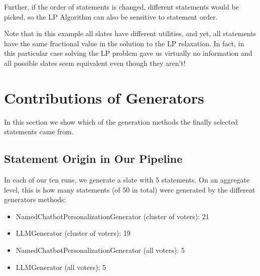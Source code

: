\documentclass[11pt]{article}
\begin{document}
Further, if the order of statements is changed, different statements would be picked, so the LP Algorithm can also be sensitive to statement order.

Note that in this example all slates have different utilities,
and yet, all statements have the same fractional value in the solution to the LP relaxation.
In fact, in this particular case solving the LP problem gave us virtually no information and all possible slates seem equivalent even though they aren't!


\section{Contributions of Generators} \label{app:statement-origin}

In this section we show which of the generation methods the finally selected statements came from.

\subsection{Statement Origin in Our Pipeline}
In each of our ten runs, we generate a slate with 5 statements. On an aggregate level, this is how many statements (of 50 in total) were generated by the different generators methods:
\begin{itemize}
    \item NamedChatbotPersonalizationGenerator (cluster of voters): 21
    \item LLMGenerator (cluster of voters): 19
    \item NamedChatbotPersonalizationGenerator (all voters): 5
    \item LLMGenerator (all voters): 5
\end{itemize}
\end{document}
